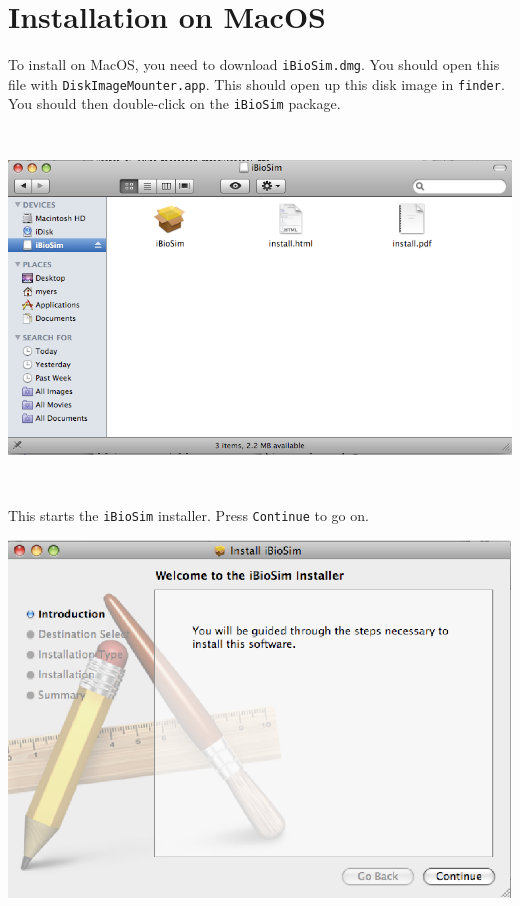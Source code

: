 \documentclass[titlepage,11pt]{article}
\begin{document}
\clearpage

\section{Installation on MacOS}

\noindent
To install on MacOS, you need to download {\tt iBioSim.dmg}.  You should
open this file with {\tt DiskImageMounter.app}.  This should open up
this disk image in {\tt finder}.  You should then
double-click on the {\tt iBioSim} package.  

\includegraphics[height=95mm]{screenshots/finder}

This starts the {\tt iBioSim} installer.  Press {\tt Continue} to go on.

\includegraphics[height=95mm]{screenshots/intro}
\end{document}
